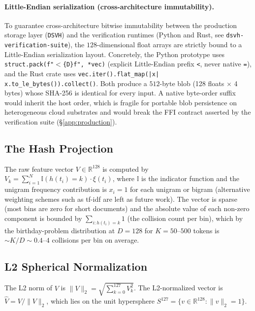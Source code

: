 \documentclass[10pt,twocolumn]{article}
\theoremstyle{definition}
\theoremstyle{remark}
\begin{document}
\paragraph{Little-Endian serialization (cross-architecture immutability).}
To guarantee cross-architecture bitwise immutability between the
production storage layer (\texttt{DSVH}) and the verification runtimes
(Python and Rust, see \texttt{dsvh-verification-suite}), the
$128$-dimensional float arrays are strictly bound to a Little-Endian
serialization layout. Concretely, the Python prototype uses
\texttt{struct.pack(f"$<$\{D\}f", *vec)} (explicit Little-Endian prefix
\texttt{<}, never native \texttt{=}), and the Rust crate uses
\texttt{vec.iter().flat\_map(|x| x.to\_le\_bytes()).collect()}. Both
produce a $512$-byte blob (128 floats $\times$ 4 bytes) whose SHA-256 is
identical for every input. A native byte-order suffix would inherit the
host order, which is fragile for portable blob persistence on
heterogeneous cloud substrates and would break the FFI contract asserted
by the verification suite (\S\ref{app:production}).

\subsection{The Hash Projection}

The raw feature vector $V \in \mathbb{R}^{128}$ is computed by
$V_k = \sum_{i=1}^{N} \mathbb{I}(h(t_i) = k) \cdot \xi(t_i)$, where
$\mathbb{I}$ is the indicator function and the unigram frequency
contribution is $x_i = 1$ for each unigram or bigram (alternative
weighting schemes such as tf-idf are left as future work). The vector
is sparse (most bins are zero for short documents) and the absolute
value of each non-zero component is bounded by $\sum_{i: h(t_i)=k} 1$
(the collision count per bin), which by the birthday-problem
distribution at $D = 128$ for $K = 50$--$500$ tokens is $\sim K/D \sim
0.4$--$4$ collisions per bin on average.

\subsection{L2 Spherical Normalization}

The L2 norm of $V$ is $\|V\|_2 = \sqrt{\sum_{k=0}^{127} V_k^2}$.
The L2-normalized vector is $\hat{V} = V / \|V\|_2$, which lies on the
unit hypersphere $S^{127} = \{v \in \mathbb{R}^{128} : \|v\|_2 = 1\}$.
\end{document}
